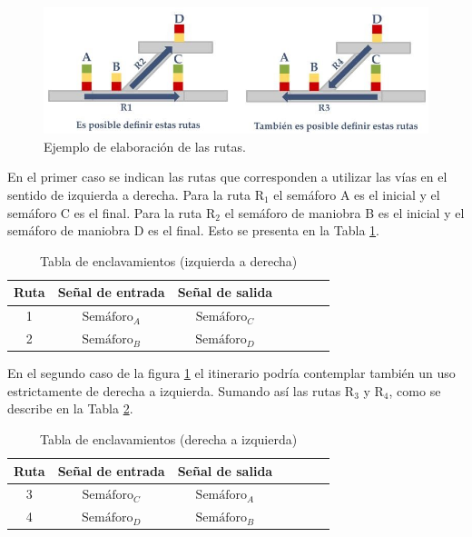 			\begin{figure}[h]
			\centering
				\includegraphics[scale=.65]{./Figures/Tablas}
				\caption{Ejemplo de elaboración de las rutas.} 
				\label{fig:EJ_Tabla}
			\end{figure}
		
		En el primer caso se indican las rutas que corresponden a utilizar las vías en el sentido de izquierda a derecha. Para la ruta $\text{R}_1$ el semáforo A es el inicial y el semáforo C es el final. Para la ruta $\text{R}_2$ el semáforo de maniobra B es el inicial y el semáforo de maniobra D es el final. Esto se presenta en la Tabla \ref{Tabla_simple}.
		
		\begin{table}[!hbt]
		\renewcommand{\arraystretch}{1.3}
	
		\caption{Tabla de enclavamientos (izquierda a derecha)}
		\label{Tabla_simple}
		\centering
	
		\begin{tabular}{c c c c c c c}
		\hline
		Ruta & Señal de entrada & Señal de salida \\
		\hline
		 1 & $\text{Semáforo}_A$  & $\text{Semáforo}_C$ \\
		 2 & $\text{Semáforo}_B$  & $\text{Semáforo}_D$ \\
		\hline
		\end{tabular}
		\end{table}
		
		En el segundo caso de la figura \ref{fig:EJ_Tabla} el itinerario podría contemplar también un uso estrictamente de derecha a izquierda. Sumando así las rutas $\text{R}_3$ y $\text{R}_4$, como se describe en la Tabla \ref{Tabla_bidireccional}.
		
		\begin{table}[!hbt]
		\renewcommand{\arraystretch}{1.3}
	
		\caption{Tabla de enclavamientos (derecha a izquierda)}
		\label{Tabla_bidireccional}
		\centering
	
		\begin{tabular}{c c c c c c c}
		\hline
		Ruta & Señal de entrada & Señal de salida \\
		\hline
		 3 & $\text{Semáforo}_C$  & $\text{Semáforo}_A$ \\
		 4 & $\text{Semáforo}_D$  & $\text{Semáforo}_B$ \\
		\hline
		\end{tabular}
		\end{table}
		
